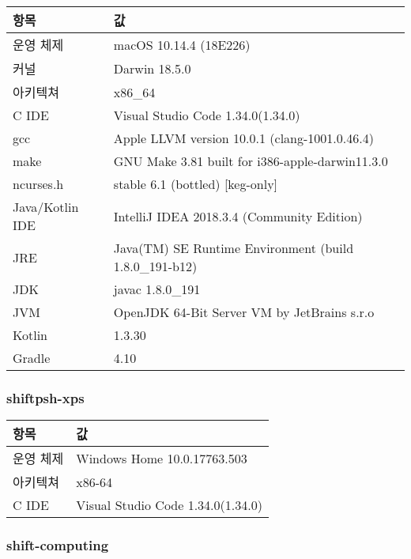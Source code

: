 \begin{tabularx}{\linewidth}{l|X}
    항목 & 값 \\
    \hline
    운영 체제 & macOS 10.14.4 (18E226) \\
    커널 & Darwin 18.5.0 \\
    아키텍쳐 & x86_64 \\
    \hline
    C IDE & Visual Studio Code 1.34.0(1.34.0) \\
    gcc & Apple LLVM version 10.0.1 (clang-1001.0.46.4) \\
    make & GNU Make 3.81 built for i386-apple-darwin11.3.0 \\
    ncurses.h & stable 6.1 (bottled) [keg-only] \\
    \hline
    Java/Kotlin IDE & IntelliJ IDEA 2018.3.4 (Community Edition) \\
    JRE & Java(TM) SE Runtime Environment (build 1.8.0_191-b12) \\
    JDK & javac 1.8.0_191 \\
    JVM & OpenJDK 64-Bit Server VM by JetBrains s.r.o \\
    Kotlin & 1.3.30 \\
    Gradle & 4.10 \\
\end{tabularx}

\subsubsection{shiftpsh-xps}\hfill

\begin{tabularx}{\linewidth}{l|X}
    항목 & 값 \\
    \hline
    운영 체제 & Windows Home 10.0.17763.503 \\
    아키텍쳐 & x86-64 \\
    \hline
    C IDE & Visual Studio Code 1.34.0(1.34.0) \\
\end{tabularx}

\subsubsection{shift-computing}\hfill

